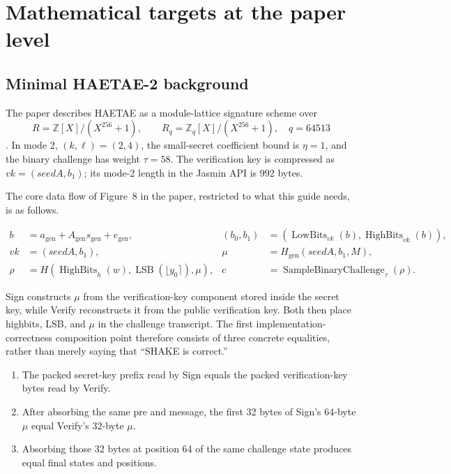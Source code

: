 \section{Mathematical targets at the paper level}
\label{sec:math-target}

\subsection{Minimal HAETAE-2 background}

The paper describes HAETAE as a module-lattice signature scheme over
\[
  R=\mathbb{Z}[X]/(X^{256}+1),\qquad
  R_q=\mathbb{Z}_q[X]/(X^{256}+1),\quad q=64513
\]
\cite{haetae-spec}. In mode 2, \((k,\ell)=(2,4)\), the small-secret
coefficient bound is \(\eta=1\), and the binary challenge has weight \(\tau=58\).
The verification key is compressed as \(vk=(\mathit{seedA},b_1)\); its mode-2
length in the Jasmin API is 992 bytes.

The core data flow of Figure~8 in the paper, restricted to what this guide
needs, is as follows.

\begin{align*}
  b &= a_{\mathrm{gen}}+A_{\mathrm{gen}}s_{\mathrm{gen}}+e_{\mathrm{gen}},
  & (b_0,b_1)&=(\operatorname{LowBits}_{vk}(b),
                    \operatorname{HighBits}_{vk}(b)),\\
  vk&=(\mathit{seedA},b_1),
  & \mu&=H_{\mathrm{gen}}(\mathit{seedA},b_1,M),\\
  \rho&=H(\operatorname{HighBits}_h(w),
          \operatorname{LSB}(\lfloor y_0\rceil),\mu),
  & c&=\operatorname{SampleBinaryChallenge}_{\tau}(\rho).
\end{align*}

Sign constructs \(\mu\) from the verification-key component stored inside the
secret key, while Verify reconstructs it from the public verification key.
Both then place highbits, LSB, and \(\mu\) in the challenge transcript.
The first implementation-correctness composition point therefore consists of
three concrete equalities, rather than merely saying that ``SHAKE is correct.''

\begin{enumerate}
  \item The packed secret-key prefix read by Sign equals the packed
        verification-key bytes read by Verify.
  \item After absorbing the same pre and message, the first 32 bytes of Sign's
        64-byte \(\mu\) equal Verify's 32-byte \(\mu\).
  \item Absorbing those 32 bytes at position 64 of the same challenge state
        produces equal final states and positions.
\end{enumerate}

